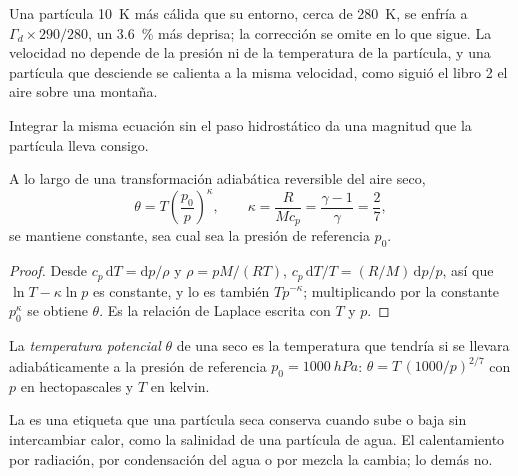 Una partícula \qty{10}{K} más cálida que su entorno, cerca de \qty{280}{K}, se enfría a
$\Gamma_d \times 290/280$, un \qty{3.6}{\percent} más deprisa; la corrección se
omite en lo que sigue. La velocidad no depende de la presión ni de la temperatura de la partícula, y una partícula que desciende se calienta a la misma velocidad, como siguió el libro 2 el aire sobre una montaña.

Integrar la misma ecuación sin el paso hidrostático da una magnitud que
la partícula lleva consigo.

\begin{proposition}\label{prop:b1:fluid-envelopes-structure:theta}
A lo largo de una transformación adiabática reversible del aire seco,
\[
  \theta = T\left(\frac{p_0}{p}\right)^{\kappa},\qquad \kappa = \frac{R}{Mc_p} =
  \frac{\gamma - 1}{\gamma} = \frac{2}{7},
\]
se mantiene constante, sea cual sea la presión de referencia $p_0$.
\end{proposition}

\begin{proof}
Desde $c_p\,\mathrm dT = \mathrm dp/\rho$ y $\rho = pM/(RT)$, $c_p\,\mathrm dT/T
= (R/M)\,\mathrm dp/p$, así que $\ln T - \kappa \ln p$ es constante, y lo es también $T
p^{-\kappa}$; multiplicando por la constante $p_0^{\kappa}$ se obtiene $\theta$. Es
la relación de Laplace escrita con $T$ y $p$.
\end{proof}

\begin{definition}\label{def:b1:fluid-envelopes-structure:potential-temperature}
La \emph{temperatura potencial} $\theta$ de una  seco es la temperatura que tendría si se llevara adiabáticamente a la presión de referencia $p_0 = \qty{1000}{hPa}$: $\theta = T\,(1000/p)^{2/7}$ con $p$ en hectopascales y $T$ en kelvin.
\end{definition}

La  es una etiqueta que una partícula seca conserva cuando sube o baja sin intercambiar calor, como la salinidad de una partícula de agua. El calentamiento por radiación, por condensación del agua o por mezcla la cambia; lo demás no.


